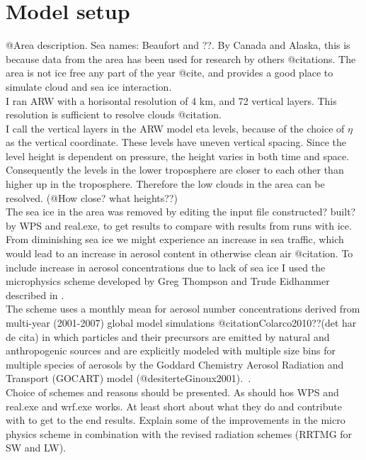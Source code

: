 \section{Model setup}
\label{sec:modelsetup}
@Area description. Sea names: Beaufort and ??. By Canada and Alaska, this is because data from the area has been used for research by others @citations. The area is not ice free any part of the year @cite, and provides a good place to simulate cloud and sea ice interaction.
\\
I ran ARW with a horisontal resolution of 4 km, and 72 vertical layers. This resolution is sufficient to resolve clouds @citation.
\\
I call the vertical layers in the ARW model eta levels, because of the choice of $\eta$ as the vertical coordinate. These levels have uneven vertical spacing. Since the level height is dependent on pressure, the height varies in both time and space. Consequently the levels in the lower troposphere are closer to each other than higher up in the troposphere. Therefore the low clouds in the area can be resolved. (@How close? what heights??)
\\
The sea ice in the area was removed by editing the input file constructed? built? by WPS and real.exe, to get results to compare with results from runs with ice.
\\
From diminishing sea ice we might experience an increase in sea traffic, which would lead to an increase in aerosol content in otherwise clean air @citation. To include increase in aerosol concentrations due to lack of sea ice I used the microphysics scheme developed by Greg Thompson and Trude Eidhammer described in \cite{Thompson2014}.
\\
The scheme uses a monthly mean for aerosol number concentrations derived from multi-year (2001-2007) global model simulations @citationColarco2010??(det har de cita) in which particles and their precursors are emitted by natural and anthropogenic sources and are explicitly modeled with multiple size bins for multiple species of aerosols by the Goddard Chemistry Aerosol Radiation and Transport (GOCART) model (@desiterteGinoux2001).~\citep{Thompson2014}.
\\
Choice of schemes and reasons should be presented. As should hos WPS and real.exe and wrf.exe works. At least short about what they do and contribute with to get to the end results. Explain some of the improvements in the micro physics scheme in combination with the revised radiation schemes (RRTMG for SW and LW).


